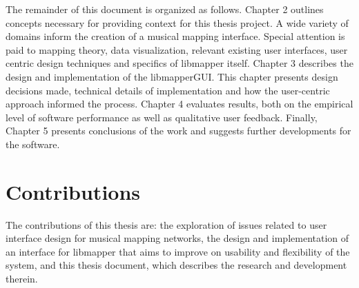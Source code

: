 The remainder of this document is organized as follows. Chapter 2 outlines concepts necessary for providing context for this thesis project. A wide variety of domains inform the creation of a musical mapping interface. Special attention is paid to mapping theory, data visualization, relevant existing user interfaces, user centric design techniques and specifics of libmapper itself. Chapter 3 describes the design and implementation of the libmapperGUI. This chapter presents design decisions made, technical details of implementation and how the user-centric approach informed the process. Chapter 4 evaluates results, both on the empirical level of software performance as well as qualitative user feedback. Finally, Chapter 5 presents conclusions of the work and suggests further developments for the software.

\section{Contributions}

The contributions of this thesis are: the exploration of issues related to user interface design for musical mapping networks, the design and implementation of an interface for libmapper that aims to improve on usability and flexibility of the system, and this thesis document, which describes the research and development therein.

